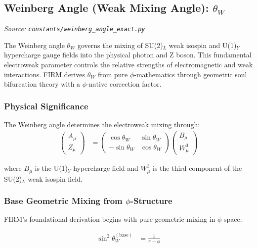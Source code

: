 
\subsection{Weinberg Angle (Weak Mixing Angle): $\theta_W$}
\textit{Source: \texttt{constants/weinberg\_angle\_exact.py}}

The Weinberg angle $\theta_W$ governs the mixing of SU(2)$_L$ weak isospin and U(1)$_Y$ hypercharge gauge fields into the physical photon and Z boson. This fundamental electroweak parameter controls the relative strengths of electromagnetic and weak interactions. FIRM derives $\theta_W$ from pure $\phi$-mathematics through geometric soul bifurcation theory with a $\phi$-native correction factor.

\subsubsection{Physical Significance}

The Weinberg angle determines the electroweak mixing through:
\begin{align}
\begin{pmatrix} A_\mu \\ Z_\mu \end{pmatrix} &= \begin{pmatrix} \cos\theta_W & \sin\theta_W \\ -\sin\theta_W & \cos\theta_W \end{pmatrix} \begin{pmatrix} B_\mu \\ W_\mu^3 \end{pmatrix} \tag{Electroweak mixing}
\end{align}

where $B_\mu$ is the U(1)$_Y$ hypercharge field and $W_\mu^3$ is the third component of the SU(2)$_L$ weak isospin field.

\subsubsection{Base Geometric Mixing from $\phi$-Structure}

FIRM's foundational derivation begins with pure geometric mixing in $\phi$-space:

\begin{align}
\sin^2\theta_W^{(\text{base})} &= \frac{1}{\pi + \phi} \tag{Pure geometric mixing}
\end{align}

